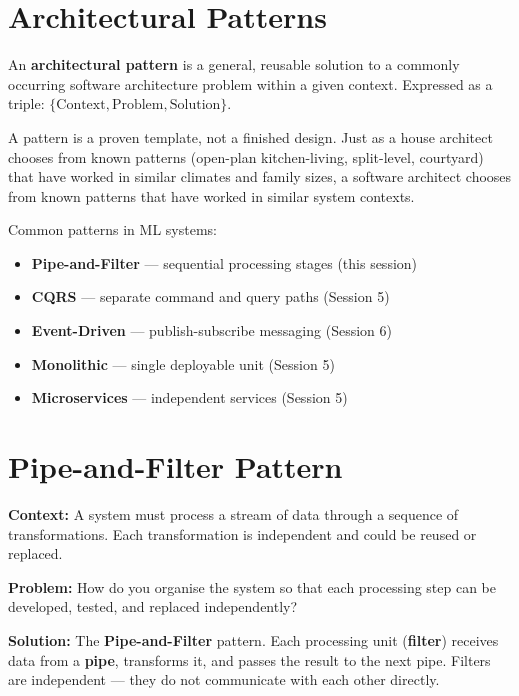 \documentclass[a4paper,11pt]{article}
\newcommand{\vocab}[1]{\textbf{\color{navy}#1}}
\begin{document}
\section{Architectural Patterns}

An \vocab{architectural pattern} is a general, reusable solution to a commonly occurring software architecture problem within a given context. Expressed as a triple: $\{\text{Context}, \text{Problem}, \text{Solution}\}$.

\begin{intuition}
A pattern is a proven template, not a finished design. Just as a house architect chooses from known patterns (open-plan kitchen-living, split-level, courtyard) that have worked in similar climates and family sizes, a software architect chooses from known patterns that have worked in similar system contexts.
\end{intuition}

Common patterns in ML systems:
\begin{itemize}
  \item \textbf{Pipe-and-Filter} --- sequential processing stages (this session)
  \item \textbf{CQRS} --- separate command and query paths (Session 5)
  \item \textbf{Event-Driven} --- publish-subscribe messaging (Session 6)
  \item \textbf{Monolithic} --- single deployable unit (Session 5)
  \item \textbf{Microservices} --- independent services (Session 5)
\end{itemize}

\section{Pipe-and-Filter Pattern}

\textbf{Context:} A system must process a stream of data through a sequence of transformations. Each transformation is independent and could be reused or replaced.

\textbf{Problem:} How do you organise the system so that each processing step can be developed, tested, and replaced independently?

\textbf{Solution:} The \vocab{Pipe-and-Filter} pattern. Each processing unit (\vocab{filter}) receives data from a \vocab{pipe}, transforms it, and passes the result to the next pipe. Filters are independent --- they do not communicate with each other directly.
\end{document}
